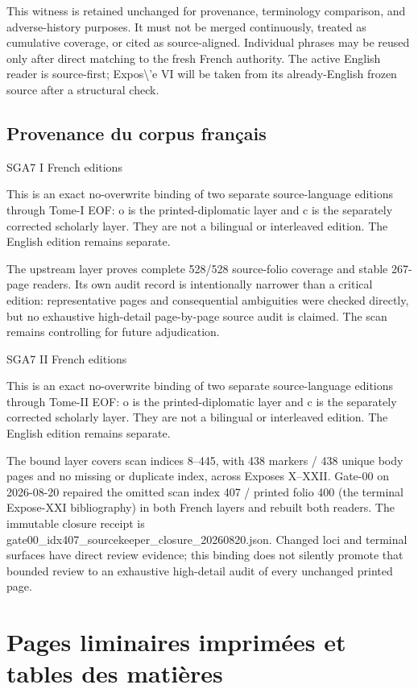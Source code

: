 This witness is retained unchanged for provenance, terminology comparison, and adverse-history purposes. It must not be merged continuously, treated as cumulative coverage, or cited as source-aligned. Individual phrases may be reused only after direct matching to the fresh French authority. The active English reader is source-first; Expos\textbackslash{}'e VI will be taken from its already-English frozen source after a structural check.


\subsection*{Provenance du corpus français}

SGA7 I French editions

This is an exact no-overwrite binding of two separate source-language editions through Tome-I EOF: o is the printed-diplomatic layer and c is the separately corrected scholarly layer. They are not a bilingual or interleaved edition. The English edition remains separate.

The upstream layer proves complete 528/528 source-folio coverage and stable 267-page readers. Its own audit record is intentionally narrower than a critical edition: representative pages and consequential ambiguities were checked directly, but no exhaustive high-detail page-by-page source audit is claimed. The scan remains controlling for future adjudication.


SGA7 II French editions

This is an exact no-overwrite binding of two separate source-language editions through Tome-II EOF: o is the printed-diplomatic layer and c is the separately corrected scholarly layer. They are not a bilingual or interleaved edition. The English edition remains separate.

The bound layer covers scan indices 8--445, with 438 markers / 438 unique body pages and no missing or duplicate index, across Exposes X--XXII. Gate-00 on 2026-08-20 repaired the omitted scan index 407 / printed folio 400 (the terminal Expose-XXI bibliography) in both French layers and rebuilt both readers. The immutable closure receipt is gate00\_idx407\_sourcekeeper\_closure\_20260820.json. Changed loci and terminal surfaces have direct review evidence; this binding does not silently promote that bounded review to an exhaustive high-detail audit of every unchanged printed page.


\section*{Pages liminaires imprimées et tables des matières}

